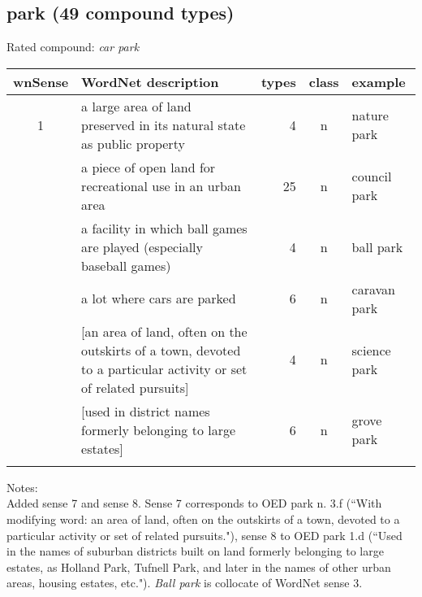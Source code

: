 \subsection{park      (49 compound types)}
Rated compound: \emph{car park}

\vspace*{1ex}

\noindent
\begin{longtable}{c>{\raggedright\arraybackslash}p{5cm}rc>{\raggedright\arraybackslash}p{2cm}}\lsptoprule
{\small wnSense}&WordNet description&types&class&example\\\midrule
1&a large area of land preserved in its natural state as public property&4&n&nature park\\\tablevspace
2&a piece of open land for recreational use in an urban area&25&n&council park\\\tablevspace
3&a facility in which ball games are played (especially baseball games)&4&n&ball park\\\tablevspace
5&a lot where cars are parked&6&n&caravan park\\\tablevspace
7&{}[an area of land, often on the
  outskirts of a town, devoted to a particular activity or set of related
  pursuits]&4&n&science park\\\tablevspace
8&{}[used in district names formerly belonging to large estates]&6&n&grove park\\\lspbottomrule
\end{longtable}

\noindent
Notes:\\
Added sense 7 and sense 8. Sense 7 corresponds to OED park n. 3.f (``With modifying word: an area of land, often on the
  outskirts of a town, devoted to a particular activity or set of related
  pursuits."), sense 8 to OED park 1.d (``Used in the names of suburban districts built on land
  formerly belonging to large estates, as Holland Park, Tufnell Park, and
  later in the names of other urban areas, housing estates, etc.").
\emph{Ball park} is collocate of WordNet sense 3.

